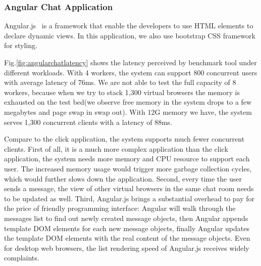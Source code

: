 







\subsubsection{Angular Chat Application}
\label{sec:angular}
Angular.js~\cite{angular} is a \js{} framework that enable the developers to 
use HTML elements to declare dynamic views.
In this application, we also use bootstrap CSS framework for styling.

Fig.\ref{fig:angularchatlatency} shows the latency perceived by benchmark tool
under different workloads.
With 4 workers, the system can support 800 concurrent users with average latency
of 76ms.
We are not able to test the full capacity of 8 workers,
because when we try to stack 1,300 virtual browsers
the memory is exhausted on the test bed(we observe free memory in the system drops to 
a few megabytes and page swap in swap out).
With 12G memory we have, the system serves 1,300 concurrent clients with a latency of 88ms.

Compare to the click application, the system supports much fewer concurrent clients.
First of all, it is a much more complex application than the click application,
the system needs more memory and CPU resource to support each user.
The increased memory usage would trigger more garbage collection cycles,
which would further slows down the application.
Second, every time the user sends a message, the view of other virtual browsers
in the same chat room needs to be updated as well.
Third, Angular.js brings a substantial overhead 
to pay for the price of friendly programming interface: %
Angular will walk through the messages list to find out newly created
message objects,
then Angular appends template DOM elements for each new message objects,
finally Angular updates the template DOM elements with the real content of the 
message objects.
Even for desktop web browsers, the list rendering speed of Angular.js
receives widely complaints.%

